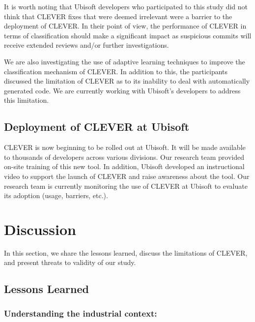 \documentclass[sigconf]{acmart}
\begin{document}
It is worth noting that Ubisoft developers who participated to this study did not think that CLEVER fixes that were 
deemed irrelevant were a barrier to the deployment of CLEVER. In their
point of view, the performance of CLEVER in terms of classification
should make a significant impact as suspicious commits
will receive extended reviews and/or further investigations.

We are also investigating the use of adaptive learning techniques to
improve the classification mechanism of CLEVER. In addition to this, the
participants discussed the limitation of CLEVER as to its inability to
deal with automatically generated code. We are currently working with
Ubisoft's developers to address this limitation.

\subsection{Deployment of CLEVER at
Ubisoft}\label{deployment-of-clever-at-ubisoft}

CLEVER is now beginning to be rolled out at Ubisoft. It will be made
available to thousands of developers across various divisions. Our
research team provided on-site training of this new tool. In addition,
Ubisoft developed an instructional video to support the launch of CLEVER
and raise awareness about the tool. Our research team is currently
monitoring the use of CLEVER at Ubisoft to evaluate its adoption (usage,
barriers, etc.).

\section{Discussion}\label{sec:threats}

In this section, we share the lessons learned, discuss the limitations
of CLEVER, and present threats to validity of our study.

\subsection{Lessons Learned}\label{lessons-learned}

\subsubsection{Understanding the industrial
context:}\label{understanding-the-industrial-context}
\end{document}
